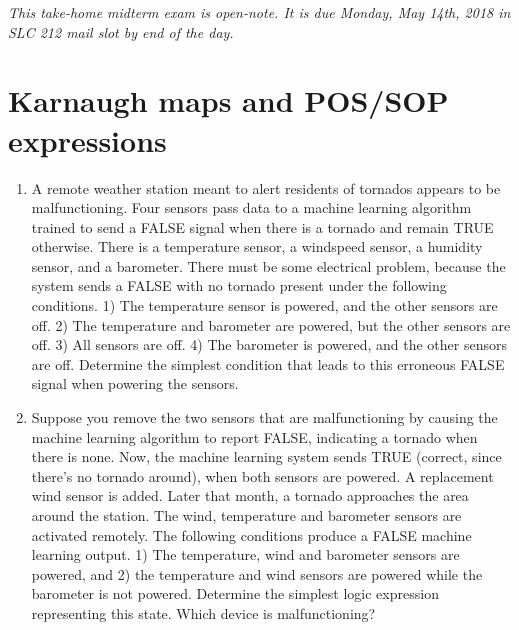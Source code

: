 \documentclass[10pt]{article}
\begin{document}
\maketitle

\textit{This take-home midterm exam is open-note.  It is due Monday, May 14th, 2018 in SLC 212 mail slot by end of the day.}

\section{Karnaugh maps and POS/SOP expressions}
\begin{enumerate}
\item A remote weather station meant to alert residents of tornados appears to be malfunctioning.  Four sensors pass data to a machine learning algorithm trained to send a FALSE signal when there is a tornado and remain TRUE otherwise.  There is a temperature sensor, a windspeed sensor, a humidity sensor, and a barometer.  There must be some electrical problem, because the system sends a FALSE with no tornado present under the following conditions.  1) The temperature sensor is powered, and the other sensors are off.  2) The temperature and barometer are powered, but the other sensors are off.  3) All sensors are off.  4) The barometer is powered, and the other sensors are off.  Determine the simplest condition that leads to this erroneous FALSE signal when powering the sensors.  \\ \vspace{4cm}
\item Suppose you remove the two sensors that are malfunctioning by causing the machine learning algorithm to report FALSE, indicating a tornado when there is none.  Now, the machine learning system sends TRUE (correct, since there's no tornado around), when both sensors are powered.  A replacement wind sensor is added.  Later that month, a tornado approaches the area around the station.  The wind, temperature and barometer sensors are activated remotely.  The following conditions produce a FALSE machine learning output.  1) The temperature, wind and barometer sensors are powered, and 2) the temperature and wind sensors are powered while the barometer is not powered.  Determine the simplest logic expression representing this state.  Which device is malfunctioning? \\ \vspace{3cm}
\end{enumerate}
\end{document}
